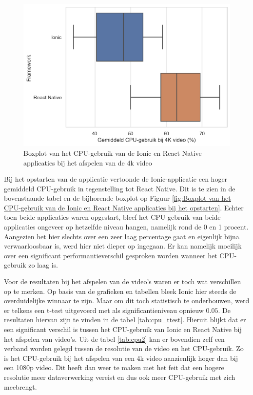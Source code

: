 \begin{figure}
  \centering
  \includegraphics[width=0.7\linewidth]{img/cpu/4k}
  \caption{Boxplot van het CPU-gebruik van de Ionic en React Native applicaties bij het afspelen van de 4k video}
  \label{fig:Boxplot van het CPU-gebruik van de Ionic en React Native applicaties bij het afspelen van de 4k video}
\end{figure}


Bij het opstarten van de applicatie vertoonde de Ionic-applicatie een hoger gemiddeld CPU-gebruik in tegenstelling tot React Native. Dit is te zien in de bovenstaande tabel en de bijhorende boxplot op Figuur \ref{fig:Boxplot van het CPU-gebruik van de Ionic en React Native applicaties bij het opstarten}. Echter toen beide applicaties waren opgestart, bleef het CPU-gebruik van beide applicaties ongeveer op hetzelfde niveau hangen, namelijk rond de 0 en 1 procent. Aangezien het hier slechts over een zeer laag percentage gaat en eigenlijk bijna verwaarloosbaar is, werd hier niet dieper op ingegaan. Er kan namelijk moeilijk over een significant performantieverschil gesproken worden wanneer het CPU-gebruik zo laag is.


Voor de resultaten bij het afspelen van de video's waren er toch wat verschillen op te merken. Op basis van de grafieken en tabellen bleek Ionic hier steeds de overduidelijke winnaar te zijn. Maar om dit toch statistisch te onderbouwen, werd er telkens een t-test uitgevoerd met als significantieniveau opnieuw \(0.05\). De resultaten hiervan zijn te vinden in de tabel \ref{tab:cpu_ttest}. Hieruit blijkt dat er een significant verschil is tussen het CPU-gebruik van Ionic en React Native bij het afspelen van video's. Uit de tabel \ref{tab:cpu2} kan er bovendien zelf een verband worden gelegd tussen de resolutie van de video en het CPU-gebruik. Zo is het CPU-gebruik bij het afspelen van een 4k video aanzienlijk hoger dan bij een 1080p video. Dit heeft dan weer te maken met het feit dat een hogere resolutie meer dataverwerking vereist en dus ook meer CPU-gebruik met zich meebrengt.


